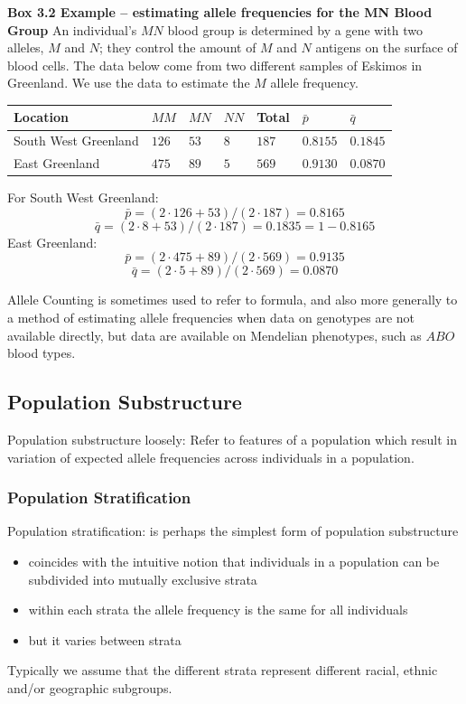 \documentclass[a4paper,twoside,11pt]{article}
\begin{document}
\begin{shaded*}
\noindent \textbf{Box 3.2 Example – estimating allele frequencies for the MN Blood Group}
\newline
\newline
An individual’s $MN$ blood group is determined by a gene with two alleles, $M$ and $N$; they control the amount of $M$ and $N$ antigens on the surface of blood cells. The data below come from two different samples of Eskimos in Greenland. We use the data to estimate the $M$ allele frequency.
\begin{center}
\centering
\begin{tabularx}{1.0\textwidth} { 
  | >{\centeringt\arraybackslash}X 
  | >{\centering\arraybackslash}X
  | >{\centering\arraybackslash}X
  | >{\centering\arraybackslash}X 
  | >{\centering\arraybackslash}X
  | >{\centering\arraybackslash}X 
  | >{\centering\arraybackslash}X | }
\hline
 Location & $MM$ & $MN$ & $NN$ & Total & $\bar{p}$ & $\bar{q}$ \\
\hline
 South West Greenland & $126$ & $53$ & $8$ & $187$ & $0.8155$ & $0.1845$ \\
\hline
 East Greenland & $475$ & $89$ & $5$ & $569$ & $0.9130$ & $0.0870$ \\
\hline
\end{tabularx}
\end{center}
For South West Greenland:
$$
\bar{p} = (2 \cdot 126 + 53)/(2 \cdot 187) = 0.8165
$$
$$
\bar{q} = (2 \cdot 8 + 53)/(2 \cdot 187) = 0.1835 = 1- 0.8165
$$
East Greenland:
$$
\bar{p} = (2 \cdot 475 + 89)/(2 \cdot 569) = 0.9135
$$
$$
\bar{q} = (2 \cdot 5 + 89)/(2 \cdot 569) = 0.0870
$$
\end{shaded*}
\noindent Allele Counting is sometimes used to refer to formula, and also more generally to a method of estimating allele frequencies when data on genotypes are not available directly, but data are available on Mendelian phenotypes, such as $ABO$ blood types.

\subsection{Population Substructure}
\textcolor{NavyBlue}{Population substructure loosely: }Refer to features of a population which result in variation of expected allele frequencies across individuals in a population.

\subsubsection{Population Stratification}
\textcolor{NavyBlue}{Population stratification}: is perhaps the simplest form of population substructure
\begin{itemize}
    \item coincides with the intuitive notion that individuals in a population can be subdivided into mutually exclusive strata
    \item within each strata the allele frequency is the same for all individuals
    \item but it varies between strata
\end{itemize}
Typically we assume that the different strata represent different racial, ethnic and/or geographic subgroups.
\end{document}
